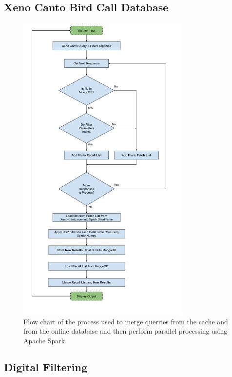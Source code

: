 \documentclass[conference,twoside]{IEEEtran}
\begin{document}
\subsection{Xeno Canto Bird Call Database}
\begin{figure}[!htb]
  \centering
  \includegraphics[width=3.4in]{project_flow_chart}
  \caption{Flow chart of the process used to merge querries from the cache and from the online database and then perform parallel processing using Apache Spark.}
  \label{fig:flow}
\end{figure}


\subsection{Digital Filtering}
\end{document}
